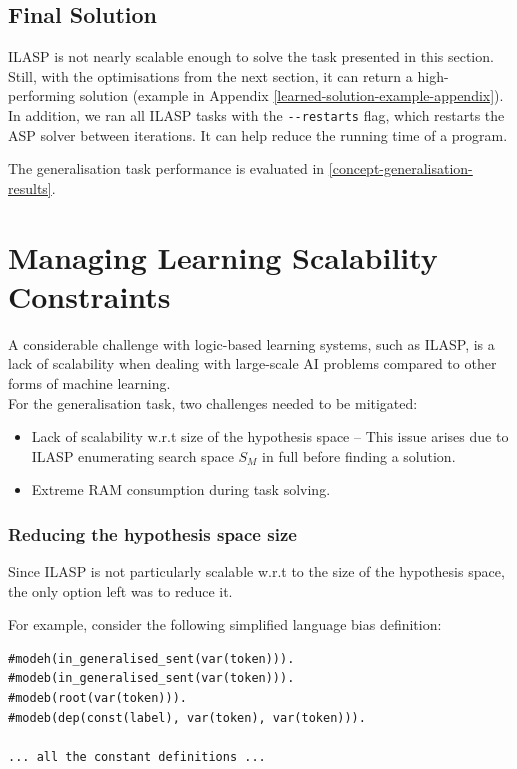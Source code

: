 \subsection{Final Solution}

ILASP is not nearly scalable enough to solve the task presented in this section. Still, with the optimisations from the next section, it can return a high-performing solution (example in Appendix \ref{learned-solution-example-appendix}).
In addition, we ran all ILASP tasks with the \verb+--restarts+ flag, which restarts the ASP solver between iterations.
It can help reduce the running time of a program.

The generalisation task performance is evaluated in \ref{concept-generalisation-results}.

\section{Managing Learning Scalability Constraints}

A considerable challenge with logic-based learning systems, such as ILASP, is a lack of scalability when dealing with large-scale AI problems compared to other forms of machine learning. \\
For the generalisation task, two challenges needed to be mitigated: 
\begin{itemize}
    \item Lack of scalability w.r.t size of the hypothesis space -- This issue arises due to ILASP enumerating search space $S_M$ in full before finding a solution.
    \item Extreme RAM consumption during task solving.
\end{itemize}

\subsubsection{Reducing the hypothesis space size}
\label{reducing-the-hypothesis-space-size}

Since ILASP is not particularly scalable w.r.t to the size of the hypothesis space, the only option left was to reduce it.

For example, consider the following simplified language bias definition:
\begin{verbatim}
#modeh(in_generalised_sent(var(token))).
#modeb(in_generalised_sent(var(token))).
#modeb(root(var(token))).
#modeb(dep(const(label), var(token), var(token))).

... all the constant definitions ...
\end{verbatim}

